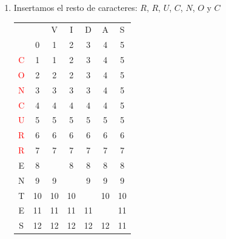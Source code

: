 \documentclass[10pt,a4paper,spanish]{report}
\theoremstyle{definition}
\theoremstyle{remark}
\begin{document}
\begin{enumerate}
\item Insertamos el resto de caracteres: $R$, $R$, $U$, $C$, $N$, $O$ y $C$
\begin{center}
\begin{tabular}{c|c|c|c|c|c|c|}
\multicolumn{2}{r}{} & \multicolumn{1}{c}{V} & \multicolumn{1}{c}{I} & \multicolumn{1}{c}{D} & \multicolumn{1}{c}{A} & \multicolumn{1}{c}{S} \\ 
\cline{2-7} 
& $0$ & 1 & 2 & 3 & 4 & 5 \\
\cline{2-7} 
\textcolor{Red}{C} & 1 & \cellcolor{Green}1 & 2 & 3 & 4 & 5 \\
\cline{2-7}
\textcolor{Red}{O} & 2 & \cellcolor{Green}2 & 2 & 3 & 4 & 5 \\
\cline{2-7} 
\textcolor{Red}{N} & 3 & \cellcolor{Green}3 & 3 & 3 & 4 & 5 \\
\cline{2-7} 
\textcolor{Red}{C} & 4 & \cellcolor{Green}4 & 4 & 4 & 4 & 5 \\
\cline{2-7} 
\textcolor{Red}{U} & 5 & \cellcolor{Green}5 & 5 & 5 & 5 & 5 \\
\cline{2-7} 
\textcolor{Red}{R} & 6 & \cellcolor{Green}6 & 6 & 6 & 6 & 6 \\
\cline{2-7} 
\textcolor{Red}{R} & 7 & \cellcolor{Green}7 & 7 & 7 & 7 & 7 \\
\cline{2-7} 
E & 8 & \cellcolor{Green}{8} & 8 & 8 & 8 & 8 \\
\cline{2-7} 
N & 9 & 9 & \cellcolor{Green}{9} & 9 & 9 & 9 \\
\cline{2-7} 
T & 10 & 10 & 10 & \cellcolor{Green}{10} & 10 & 10 \\
\cline{2-7} 
E & 11 & 11 & 11 & 11 & \cellcolor{Green}{11} & 11 \\
\cline{2-7} 
S & 12 & 12 & 12 & 12 & 12 & \cellcolor{Green}11 \\
\cline{2-7}
\end{tabular}
\end{center}
\end{enumerate}

\newpage
\end{document}
